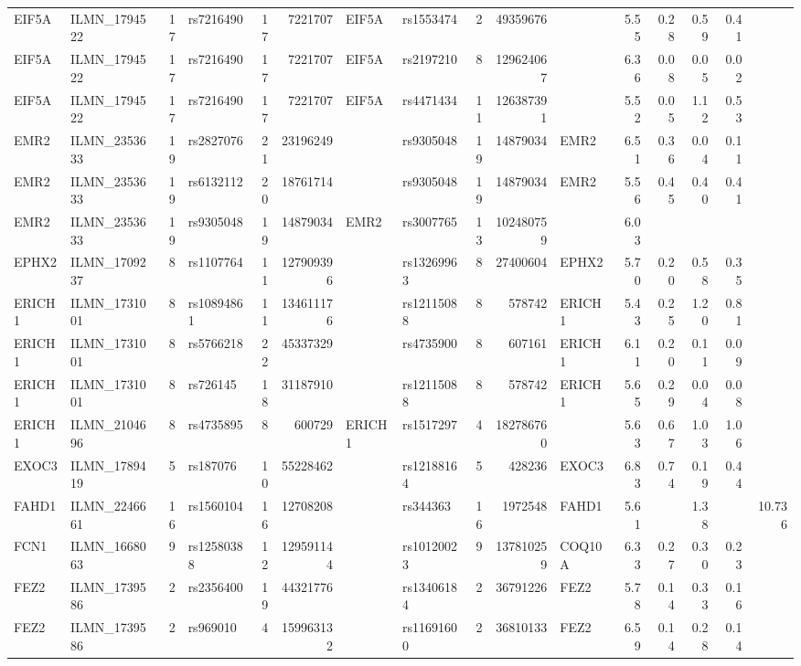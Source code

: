 \documentclass{article}
\begin{document}
\begin{landscape}
{\begin{ThreePartTable}
\begin{longtable}{|llr|lrrl|lrrl|rrrr|r|}
EIF5A & ILMN\_1794522 & 17 & rs7216490 & 17 & 7221707 & EIF5A & rs1553474 & 2 & 49359676 &  & 5.55 & 0.28 & 0.59 & 0.41 &  \\
EIF5A & ILMN\_1794522 & 17 & rs7216490 & 17 & 7221707 & EIF5A & rs2197210 & 8 & 129624067 &  & 6.36 & 0.08 & 0.05 & 0.02 &  \\
EIF5A & ILMN\_1794522 & 17 & rs7216490 & 17 & 7221707 & EIF5A & rs4471434 & 11 & 126387391 &  & 5.52 & 0.05 & 1.12 & 0.53 &  \\
EMR2 & ILMN\_2353633 & 19 & rs2827076 & 21 & 23196249 &  & rs9305048 & 19 & 14879034 & EMR2 & 6.51 & 0.36 & 0.04 & 0.11 &  \\
EMR2 & ILMN\_2353633 & 19 & rs6132112 & 20 & 18761714 &  & rs9305048 & 19 & 14879034 & EMR2 & 5.56 & 0.45 & 0.40 & 0.41 &  \\
EMR2 & ILMN\_2353633 & 19 & rs9305048 & 19 & 14879034 & EMR2 & rs3007765 & 13 & 102480759 &  & 6.03 &  &  &  &  \\
EPHX2 & ILMN\_1709237 & 8 & rs1107764 & 11 & 127909396 &  & rs13269963 & 8 & 27400604 & EPHX2 & 5.70 & 0.20 & 0.58 & 0.35 &  \\
ERICH1 & ILMN\_1731001 & 8 & rs10894861 & 11 & 134611176 &  & rs12115088 & 8 & 578742 & ERICH1 & 5.43 & 0.25 & 1.20 & 0.81 &  \\
ERICH1 & ILMN\_1731001 & 8 & rs5766218 & 22 & 45337329 &  & rs4735900 & 8 & 607161 & ERICH1 & 6.11 & 0.20 & 0.11 & 0.09 &  \\
ERICH1 & ILMN\_1731001 & 8 & rs726145 & 18 & 31187910 &  & rs12115088 & 8 & 578742 & ERICH1 & 5.65 & 0.29 & 0.04 & 0.08 &  \\
ERICH1 & ILMN\_2104696 & 8 & rs4735895 & 8 & 600729 & ERICH1 & rs1517297 & 4 & 182786760 &  & 5.63 & 0.67 & 1.03 & 1.06 &  \\
EXOC3 & ILMN\_1789419 & 5 & rs187076 & 10 & 55228462 &  & rs12188164 & 5 & 428236 & EXOC3 & 6.83 & 0.74 & 0.19 & 0.44 &  \\
FAHD1 & ILMN\_2246661 & 16 & rs1560104 & 16 & 12708208 &  & rs344363 & 16 & 1972548 & FAHD1 & 5.61 &  & 1.38 &  & 10.736 \\
FCN1 & ILMN\_1668063 & 9 & rs12580388 & 12 & 129591144 &  & rs10120023 & 9 & 137810259 & COQ10A & 6.33 & 0.27 & 0.30 & 0.23 &  \\
FEZ2 & ILMN\_1739586 & 2 & rs2356400 & 19 & 44321776 &  & rs13406184 & 2 & 36791226 & FEZ2 & 5.78 & 0.14 & 0.33 & 0.16 &  \\
FEZ2 & ILMN\_1739586 & 2 & rs969010 & 4 & 159963132 &  & rs11691600 & 2 & 36810133 & FEZ2 & 6.59 & 0.14 & 0.28 & 0.14 &  \\

\end{longtable}
\end{ThreePartTable}}
\end{landscape}
\end{document}
